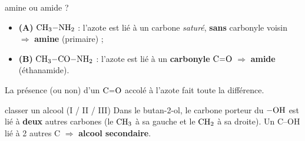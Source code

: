 \documentclass[11pt,a4paper]{article}
\newcommand{\rep}[1]{\textcolor{primarydark}{\textbf{#1}}}
\begin{document}
\begin{corr}{amine ou amide ?}
\begin{itemize}[leftmargin=1.6em,itemsep=1pt]
  \item \textbf{(A)} $\ce{CH3-NH2}$ : l'azote est lié à un carbone \emph{saturé}, \textbf{sans} carbonyle voisin $\Rightarrow$ \rep{amine} (primaire) ;
  \item \textbf{(B)} $\ce{CH3-CO-NH2}$ : l'azote est lié à un \textbf{carbonyle} $\ce{C=O}$ $\Rightarrow$ \rep{amide} (éthanamide).
\end{itemize}
La présence (ou non) d'un $\ce{C=O}$ accolé à l'azote fait toute la différence.
\end{corr}

\begin{corr}{classer un alcool (I / II / III)}
Dans le butan-2-ol, le carbone porteur du $\ce{-OH}$ est lié à \textbf{deux} autres carbones (le $\ce{CH3}$ à sa gauche et le $\ce{CH2}$ à sa droite). Un C--OH lié à 2 autres C $\Rightarrow$ \rep{alcool secondaire}.
\end{corr}
\end{document}

